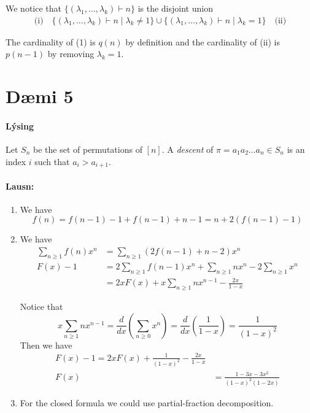 \documentclass[a4paper,notitlepage]{article}
\makeatletter
\theoremstyle{plain}
\theoremstyle{definition}
\newcommand{\leqnomode}{\tagsleft@true}
\makeatother
\begin{document}
\begin{enumerate}
        We notice that $\{(\lambda_1,\dots,\lambda_k) \vdash n \}$ is the disjoint union
        \begin{align*}
            \text{(i)}\quad\{(\lambda_1,\dots,\lambda_k) \vdash n \mid \lambda_k \neq 1\} \cup \{(\lambda_1,\dots,\lambda_k)\vdash n \mid \lambda_k = 1\}\quad\text{(ii)}
        \end{align*}

        The cardinality of (1) is $q(n)$ by definition and the cardinality of (ii) is $p(n-1)$ by removing $\lambda_k = 1$.

\end{enumerate}


\section*{Dæmi 5}
\paragraph{Lýsing} Let $S_n$ be the set of permutations of $[n]$. A \emph{descent} of $\pi = a_1a_2\dots a_n \in S_n$ is an index $i$ such that $a_i > a_{i+1}$.
\paragraph{Lausn:}
\begin{enumerate}
    \item We have
        \begin{equation*}
            f(n) = f(n-1) - 1 + f(n-1) + n - 1 = n + 2(f(n-1) - 1)
        \end{equation*}

    \item We have
        \leqnomode
        \begin{align*}
            \sum_{n\geq 1}f(n)x^n &= \sum_{n\geq 1} (2f(n-1)+n - 2)x^n \\
            \tag*{so} F(x) - 1 &=  2\sum_{n\geq 1} f(n-1)x^n + \sum_{n\geq 1}nx^n - 2\sum_{n\geq 1}x^n \\
            &= 2xF(x) + x \sum_{n\geq 1} nx^{n-1} - \frac{2x}{1-x}
        \end{align*}

        Notice that
        \begin{equation*}
            x\sum_{n\geq 1}n x ^{n-1} = \frac{d}{dx}\left( \sum_{n\geq 0}x^n \right) = \frac{d}{dx} \left( \frac{1}{1-x} \right) = \frac{1}{(1-x)^2}
        \end{equation*}
        Then we have
        \leqnomode
        \begin{align*}
            F(x)-1 = 2xF(x) + \frac{1}{(1-x)^2} - \frac{2x}{1-x} \\
            \tag*{so} F(x) &= \frac{1-3x-3x^2}{(1-x)^2(1-2x)}
        \end{align*}

    \item For the closed formula we could use partial-fraction decomposition.
\end{enumerate}
\end{document}

